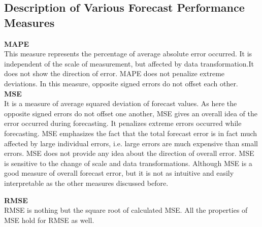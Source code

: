 \subsection{Description of Various Forecast Performance Measures}
\textbf{MAPE}\\
This measure represents the percentage of average absolute error occurred. It is independent of the scale of measurement, but affected by data transformation.It does not show the direction of error. MAPE does not penalize extreme deviations. In this measure, opposite signed errors do not offset each other.
\\
\textbf{MSE}\\
It is a measure of average squared deviation of forecast values. As here the opposite signed errors do not offset one another, MSE gives an overall idea of the error occurred during forecasting. It penalizes extreme errors occurred while forecasting. MSE emphasizes the fact that the total forecast error is in fact much   affected by large individual errors, i.e. large errors are much expensive than small errors. MSE does not provide any idea about the direction of overall error. MSE is sensitive to the change of scale and data transformations. Although MSE is a good measure of overall forecast error, but it is   not as intuitive and easily interpretable as the other measures discussed before. 

\textbf{RMSE}\\
RMSE is nothing but the square root of calculated MSE. All the properties of MSE hold for RMSE as well.

